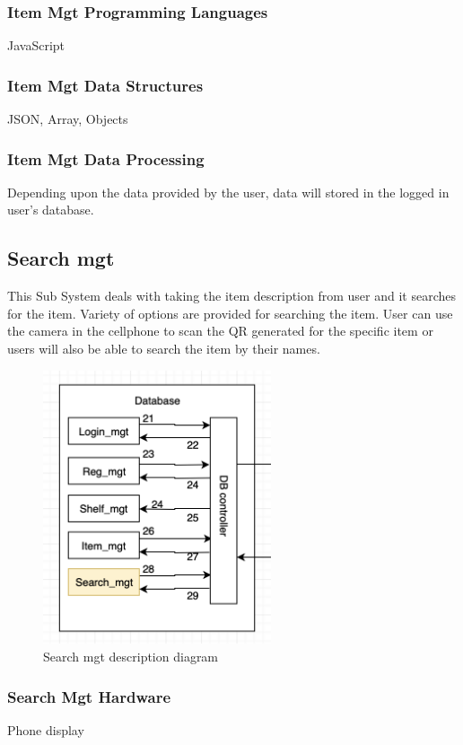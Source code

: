 \subsubsection{Item Mgt Programming Languages}
JavaScript

\subsubsection{Item Mgt Data Structures}
JSON, Array, Objects

\subsubsection{Item Mgt Data Processing}
Depending upon the data provided by the user, data will stored in the logged in user's database.

\subsection{Search mgt}
This Sub System deals with taking the item description from user and it searches for the item. Variety of options are provided for searching the item. User can use the camera in the cellphone to scan the QR generated for the specific item or users will also be able to search the item by their names.

\begin{figure}[h!]
	\centering
 	\includegraphics[width=0.60\textwidth]{images/searchmgt}
 \caption{Search mgt description diagram}
\end{figure}

\subsubsection{Search Mgt Hardware}
Phone display

